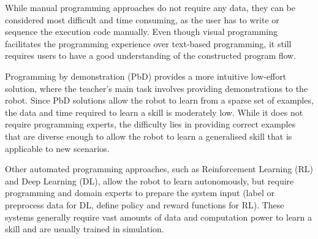 While manual programming approaches do not require any data, they can be considered most difficult and time consuming, as the user has to write or sequence the execution code manually.
Even though visual programming facilitates the programming experience over text-based programming, it still requires users to have a good understanding of the constructed program flow.

Programming by demonstration (PbD) provides a more intuitive low-effort solution, where the teacher's main task involves providing demonstrations to the robot.
Since PbD solutions allow the robot to learn from a sparse set of examples, the data and time required to learn a skill is moderately low.
While it does not require programming experts, the difficulty lies in providing correct examples that are diverse enough to allow the robot to learn a generalised skill that is applicable to new scenarios.

Other automated programming approaches, such as Reinforcement Learning (RL) and Deep Learning (DL), allow the robot to learn autonomously, but require programming and domain experts to prepare the system input (\eg label or preprocess data for DL, define policy and reward functions for RL). %
These systems generally require vast amounts of data and computation power to learn a skill and are usually trained in simulation.



